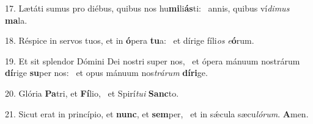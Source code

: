17. Lætáti sumus pro diébus, quibus nos hu\textbf{mi}li\textbf{ás}ti: \ast\  annis, quibus ví\textit{di}\textit{mus} \textbf{ma}la.\

18. Réspice in servos tuos, et in \textbf{ó}pera \textbf{tu}a: \ast\  et dírige fíli\textit{os} \textit{e}\textbf{ó}rum.\

19. Et sit splendor Dómini Dei nostri super nos, \dag\  et ópera mánuum nostrárum \textbf{dí}rige \textbf{su}per nos: \ast\  et opus mánuum nos\textit{trá}\textit{rum} \textbf{dí}\textbf{ri}ge.\

20. Glória \textbf{Pa}tri, et \textbf{Fí}lio, \ast\  et Spirí\textit{tu}\textit{i} \textbf{Sanc}to.\

21. Sicut erat in princípio, et \textbf{nunc}, et \textbf{sem}per, \ast\  et in sǽcula sæcu\textit{ló}\textit{rum}. \textbf{A}men.\

